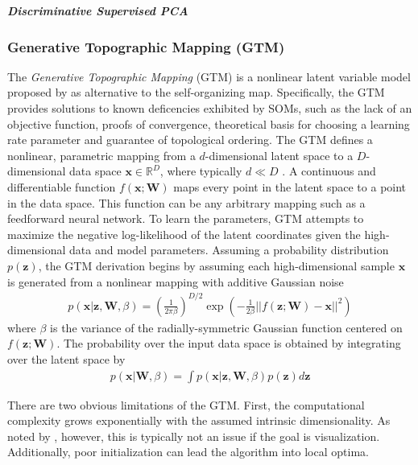 \subparagraph{Discriminative Supervised PCA} 

\subsubsection{Generative Topographic Mapping (GTM)} \label{sec:GTM}
The \textit{Generative Topographic Mapping} (GTM) is a nonlinear latent variable model proposed by \citep{Bishop1998GTM} as alternative to the self-organizing map.  Specifically, the GTM provides solutions to known deficencies exhibited by SOMs, such as the lack of an objective function, proofs of convergence, theoretical basis for choosing a learning rate parameter and guarantee of topological ordering.  The GTM defines a nonlinear, parametric mapping from a $d$-dimensional latent space to a $D$-dimensional data space $\bm{x} \in \mathbb{R}^{D}$, where typically $d \ll D$ \citep{Pena2007NeuralGasReview}.  A continuous and differentiable function $f(\bm{x;\bm{W}})$ maps every point in the latent space to a point in the data space.  This function can be any arbitrary mapping such as a feedforward neural network.  To learn the parameters, GTM attempts to maximize the negative log-likelihood of the latent coordinates given the high-dimensional data and model parameters.  Assuming a probability distribution $p(\bm{z})$, the GTM derivation begins by assuming each high-dimensional sample $\bm{x}$ is generated from a nonlinear mapping with additive Gaussian noise
\begin{align}
	p(\bm{x}|\bm{z},\bm{W},\beta) = \left ( \frac{1}{2 \pi \beta} \right )^{D/2} \exp{\left ( -\frac{1}{2 \beta} ||f(\bm{z};\bm{W}) - \bm{x} ||^{2} \right )}
\end{align}
\noindent
where $\beta$ is the variance of the radially-symmetric Gaussian function centered on $f(\bm{z};\bm{W})$.  The probability over the input data space is obtained by integrating over the latent space by
\begin{align}
		p(\bm{x}|\bm{W},\beta) = \int p(\bm{x}|\bm{z},\bm{W},\beta) p(\bm{z}) d \bm{z}
\end{align}

There are two obvious limitations of the GTM.  First, the computational complexity grows exponentially with the assumed intrinsic dimensionality.  As noted by \citep{Pena2007NeuralGasReview}, however, this is typically not an issue if the goal is visualization.  Additionally, poor initialization can lead the algorithm into local optima. 



